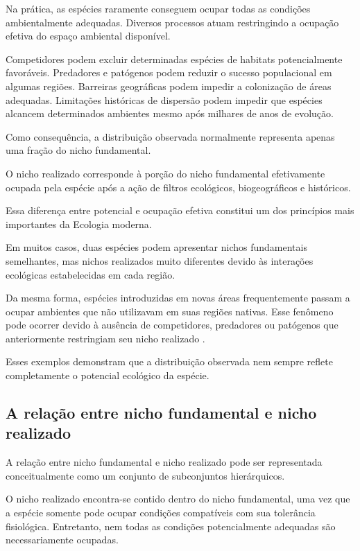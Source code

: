 Na prática, as espécies raramente conseguem ocupar todas as condições ambientalmente adequadas. Diversos processos atuam restringindo a ocupação efetiva do espaço ambiental disponível.

Competidores podem excluir determinadas espécies de habitats potencialmente favoráveis. Predadores e patógenos podem reduzir o sucesso populacional em algumas regiões. Barreiras geográficas podem impedir a colonização de áreas adequadas. Limitações históricas de dispersão podem impedir que espécies alcancem determinados ambientes mesmo após milhares de anos de evolução.

Como consequência, a distribuição observada normalmente representa apenas uma fração do nicho fundamental.

\begin{conceito}
	O nicho realizado corresponde à porção do nicho fundamental efetivamente ocupada pela espécie após a ação de filtros ecológicos, biogeográficos e históricos.
\end{conceito}

Essa diferença entre potencial e ocupação efetiva constitui um dos princípios mais importantes da Ecologia moderna.

Em muitos casos, duas espécies podem apresentar nichos fundamentais semelhantes, mas nichos realizados muito diferentes devido às interações ecológicas estabelecidas em cada região.

Da mesma forma, espécies introduzidas em novas áreas frequentemente passam a ocupar ambientes que não utilizavam em suas regiões nativas. Esse fenômeno pode ocorrer devido à ausência de competidores, predadores ou patógenos que anteriormente restringiam seu nicho realizado \parencite{peterson2011}.

Esses exemplos demonstram que a distribuição observada nem sempre reflete completamente o potencial ecológico da espécie.

\subsection{A relação entre nicho fundamental e nicho realizado}

A relação entre nicho fundamental e nicho realizado pode ser representada conceitualmente como um conjunto de subconjuntos hierárquicos.

O nicho realizado encontra-se contido dentro do nicho fundamental, uma vez que a espécie somente pode ocupar condições compatíveis com sua tolerância fisiológica. Entretanto, nem todas as condições potencialmente adequadas são necessariamente ocupadas.

